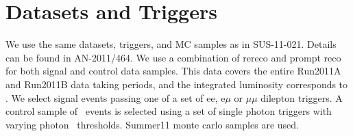 
\section{Datasets and Triggers}
\label{sec:datasets}


We use the same datasets, triggers, and MC samples as in SUS-11-021. Details can be found in AN-2011/464.
We use a combination of rereco and prompt reco for both signal and control data samples. %
This data covers the entire Run2011A and Run2011B data taking periods,
and the integrated luminosity corresponds to \lumi.
We select signal events passing one of a set of ee, e$\mu$ or $\mu\mu$ dilepton triggers.
A control sample of \gjets\ events is selected using a set of single photon triggers with varying
photon \pt\ thresholds.
Summer11 monte carlo samples are used.

